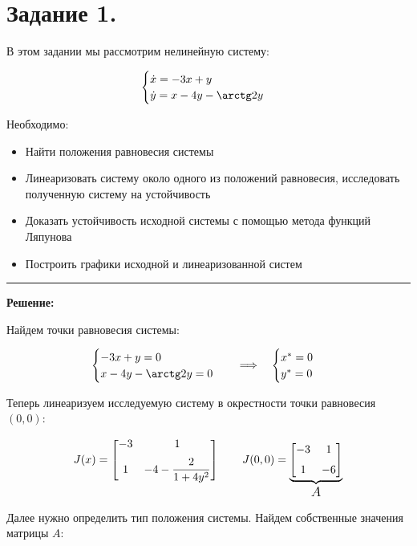 \documentclass[a4paper,12pt]{article}
\begin{document}
	\newpage
	\tableofcontents
	
	\newpage
	\section{Задание 1.}

	В этом задании мы рассмотрим нелинейную систему:
	
	\[
	\begin{cases}
		\dot{x} = -3x + y \\
		\dot{y} = x - 4y - \arctg2y
	\end{cases}
	\]

	Необходимо:
	\begin{itemize}
		\item Найти положения равновесия системы
		\item Линеаризовать систему около одного из положений равновесия,
		исследовать полученную систему на устойчивость
		\item Доказать устойчивость исходной системы с помощью метода
		функций Ляпунова
		\item Построить графики исходной и линеаризованной систем
	\end{itemize}
	
	\hrule
	\[\]	
	\textbf{Решение: }
	
	Найдем точки равновесия системы:
	
	\[
	\begin{cases}
		-3x + y = 0\\
		x - 4y - \arctg2y = 0
	\end{cases} 
	\quad \Longrightarrow \quad 
	\begin{cases}
		x^* = 0\\
		y^* = 0
	\end{cases} 
	\] 
	
	Теперь линеаризуем исследуемую систему в окрестности точки равновесия \((0, 0)\):

	\[
	J(x) = 
	\begin{bmatrix}
		-3 & 1 \\[6pt]
		1 & -4 - \dfrac{2}{1+4y^2}
	\end{bmatrix} 
	\qquad
	J(0, 0) = 
	\underbrace{\begin{bmatrix}
		-3 & 1 \\[6pt]
		1 & -6
	\end{bmatrix}}_{\text{\large \(A\)}}
	\]

	Далее нужно определить тип положения системы. Найдем собственные значения матрицы \(A\):
	
\end{document}
